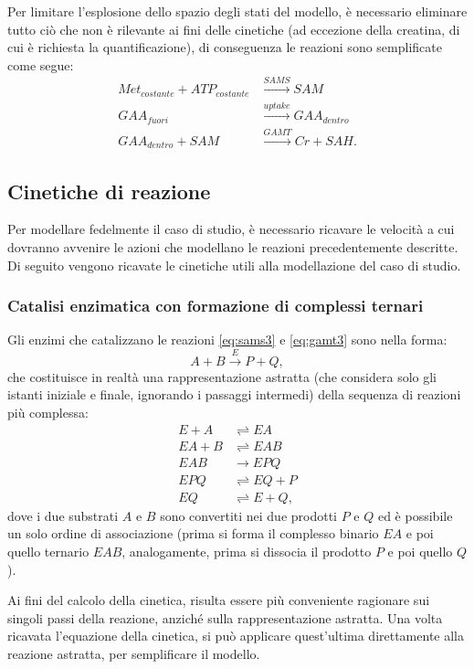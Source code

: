 Per limitare l'esplosione dello spazio degli stati del modello, \`e necessario eliminare tutto ci\`o che non \`e rilevante ai fini delle cinetiche (ad eccezione della creatina, di cui \`e richiesta la quantificazione), di conseguenza le reazioni sono semplificate come segue:
\begin{align}
	Met_{costante} + ATP_{costante} &\xrightarrow{SAMS} SAM\label{eq:sams3}\\
	GAA_{fuori} &\xrightarrow{uptake} GAA_{dentro}\label{eq:uptake3}\\
	GAA_{dentro} + SAM &\xrightarrow{GAMT} Cr + SAH\label{eq:gamt3}.
\end{align}

\subsection{Cinetiche di reazione}
Per modellare fedelmente il caso di studio, \`e necessario ricavare le velocit\`a a cui dovranno avvenire le azioni che modellano le reazioni precedentemente descritte.
Di seguito vengono ricavate le cinetiche utili alla modellazione del caso di studio.

\subsubsection{Catalisi enzimatica con formazione di complessi ternari}
Gli enzimi che catalizzano le reazioni \ref{eq:sams3} e \ref{eq:gamt3} sono nella forma:
\begin{equation*}
	A + B \xrightarrow{E} P + Q,
\end{equation*}
	che costituisce in realt\`a una rappresentazione astratta (che considera solo gli istanti iniziale e finale, ignorando i passaggi intermedi) della sequenza di reazioni pi\`u complessa:
\begin{align*}
	E + A &\rightleftharpoons EA\\
	EA + B &\rightleftharpoons EAB\\
	EAB &\rightarrow EPQ\\
	EPQ &\rightleftharpoons EQ + P\\
	EQ &\rightleftharpoons E + Q,
\end{align*}
	dove i due substrati $A$ e $B$ sono convertiti nei due prodotti $P$ e $Q$ ed \`e possibile un solo ordine di associazione (prima si forma il complesso binario $EA$ e poi quello ternario $EAB$, analogamente, prima si dissocia il prodotto $P$ e poi quello $Q$).
	
	Ai fini del calcolo della cinetica, risulta essere pi\`u conveniente ragionare sui singoli passi della reazione, anzich\'e sulla rappresentazione astratta. Una volta ricavata l'equazione della cinetica, si pu\`o applicare quest'ultima direttamente alla reazione astratta, per semplificare il modello.

